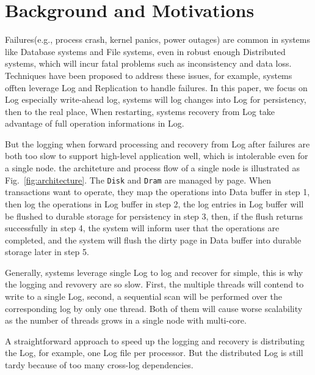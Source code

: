 \section{Background and Motivations}
Failures(e.g., process crash, kernel panics, power outages) are common in systems like Database systems and File systems, even in robust enough Distributed systems, which will incur fatal problems such as inconsistency and data loss. Techniques have been proposed to address these issues, for example, systems offten leverage Log and Replication to handle failures. In this paper, we focus on Log especially write-ahead log, systems will log changes into Log for persistency, then to the real place,  When restarting, systems recovery from Log take advantage of full operation informations in Log.

But the logging when forward processing and recovery from Log after failures are both too slow to support high-level application well, which is intolerable even for a single node. the architeture and process flow of a single node is illustrated as Fig.~\ref{fig:architecture}. The \texttt{Disk} and \texttt{Dram} are managed by page. When transactions want to operate, they map the operations into Data buffer in step 1, then log the operations in Log buffer in step 2, the log entries in Log buffer will be flushed to durable storage for persistency in step 3, then, if the flush returns successfully in step 4, the system will inform user that the operations are completed, and the system will flush the dirty page in Data buffer into durable storage later in step 5.

Generally, systems leverage single Log to log and recover for simple, this is why the logging and revovery are so slow. First, the multiple threads will contend to write to a single Log, second, a sequential scan will be performed over the corresponding log by only one thread. Both of them will cause worse scalability as the number of threads grows in a single node with multi-core.

A straightforward approach to speed up the logging and recovery is distributing the Log, for example, one Log file per processor. But the distributed Log is still tardy because of too many cross-log dependencies.

